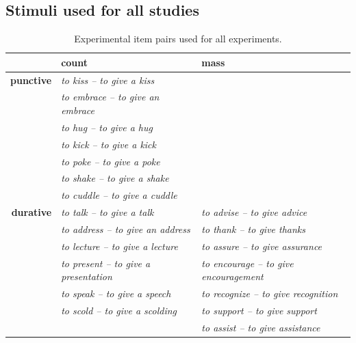 \documentclass[review,12pt,authoryear]{elsarticle}
\newcommand*{\sectionformat}{\centering}
\begin{document}
\subsection*{\sectionformat Stimuli used for all studies}
\label{sec_stims}
\begin{table}[h]
\hspace{-1cm}\noindent
\begin{tabular}{ r | l | l |  }
 			& 	\textbf{count} 				& 	\textbf{mass}  \\ \hline
\textbf{punctive} 		&	\emph{to kiss -- to give a kiss  }	& 		\cellcolor[gray]{.8}			\\ 
			&	\emph{to embrace -- to give an embrace} & \cellcolor[gray]{.8}\\
			&	\emph{to hug -- to give a hug} & \cellcolor[gray]{.8}\\
			& 	\emph{to kick -- to give a kick} & \cellcolor[gray]{.8}\\
			&	\emph{to poke -- to give a poke} & \cellcolor[gray]{.8}\\
			& 	\emph{to shake -- to give a shake} & \cellcolor[gray]{.8}\\
			&	\emph{to cuddle -- to give a cuddle }& \cellcolor[gray]{.8}\\ \hline
\textbf{durative}		&	\emph{to talk -- to give a talk}	&	\emph{to advise -- to give advice} \\
			&	\emph{to address -- to give an address}	&	\emph{to thank -- to give thanks}\\
			&	\emph{to lecture -- to give a lecture}	&	\emph{to assure -- to give assurance} \\
			&	\emph{to present -- to give a presentation}	&	\emph{to encourage -- to give encouragement} \\
			&	\emph{to speak -- to give a speech}	&	\emph{to recognize -- to give recognition} \\
			&	\emph{to scold -- to give a scolding}			&	\emph{to support -- to give support} \\
			&		 \cellcolor[gray]{.9}			&	 \emph{to assist -- to give assistance} \\\hline
			
\end{tabular}
\caption{Experimental item pairs used for all experiments.}
\label{ex_pairs}
\end{table}
\end{document}
